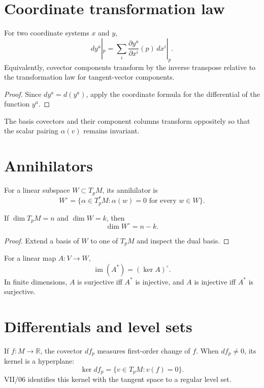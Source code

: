 \section{Coordinate transformation law}
\begin{theorem}\label{thm:vii05-coframe-transform}
For two coordinate systems \(x\) and \(y\),
\[
dy^a|_p=\sum_i\frac{\partial y^a}{\partial x^i}(p)\,dx^i|_p.
\]
Equivalently, covector components transform by the inverse transpose relative to the transformation law for tangent-vector components.
\end{theorem}
\begin{proof}
Since \(dy^a=d(y^a)\), apply the coordinate formula for the differential of the function \(y^a\).
\end{proof}

\begin{remark}\label{rem:vii05-covariant}
The basis covectors and their component columns transform oppositely so that the scalar pairing \(\alpha(v)\) remains invariant.
\end{remark}

\section{Annihilators}
\begin{definition}[Annihilator]\label{def:vii05-annihilator}
For a linear subspace \(W\subset T_pM\), its annihilator is
\[
W^\circ=\{\alpha\in T_p^*M:\alpha(w)=0\text{ for every }w\in W\}.
\]
\end{definition}

\begin{theorem}\label{thm:vii05-annihilator-dimension}
If \(\dim T_pM=n\) and \(\dim W=k\), then
\[
\dim W^\circ=n-k.
\]
\end{theorem}
\begin{proof}
Extend a basis of \(W\) to one of \(T_pM\) and inspect the dual basis.
\end{proof}

\begin{proposition}\label{prop:vii05-kernel-annihilator}
For a linear map \(A:V\to W\),
\[
\operatorname{im}(A^*)=(\ker A)^\circ.
\]
In finite dimensions, \(A\) is surjective iff \(A^*\) is injective, and \(A\) is injective iff \(A^*\) is surjective.
\end{proposition}

\section{Differentials and level sets}
If \(f:M\to\mathbb R\), the covector \(df_p\) measures first-order change of \(f\). When \(df_p\neq0\), its kernel is a hyperplane:
\[
\ker df_p=\{v\in T_pM:v(f)=0\}.
\]
VII/06 identifies this kernel with the tangent space to a regular level set.

